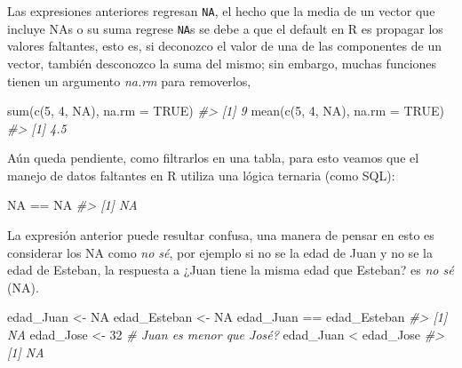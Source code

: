 \documentclass[
]{book}
\newenvironment{Shaded}{\begin{snugshade}}{\end{snugshade}}
\newcommand{\AttributeTok}[1]{\textcolor[rgb]{0.77,0.63,0.00}{#1}}
\newcommand{\CommentTok}[1]{\textcolor[rgb]{0.56,0.35,0.01}{\textit{#1}}}
\newcommand{\ConstantTok}[1]{\textcolor[rgb]{0.00,0.00,0.00}{#1}}
\newcommand{\DecValTok}[1]{\textcolor[rgb]{0.00,0.00,0.81}{#1}}
\newcommand{\FunctionTok}[1]{\textcolor[rgb]{0.00,0.00,0.00}{#1}}
\newcommand{\NormalTok}[1]{#1}
\newcommand{\OtherTok}[1]{\textcolor[rgb]{0.56,0.35,0.01}{#1}}
\newcommand{\SpecialCharTok}[1]{\textcolor[rgb]{0.00,0.00,0.00}{#1}}
\begin{document}
Las expresiones anteriores regresan \texttt{NA}, el hecho que la media de un vector
que incluye NAs o su suma regrese \texttt{NA}s se debe a que el default en R es
propagar los valores faltantes, esto es, si deconozco el valor de una de las
componentes de un vector, también desconozco la suma del mismo; sin embargo,
muchas funciones tienen un argumento \emph{na.rm} para removerlos,

\begin{Shaded}
\begin{Highlighting}[]
\FunctionTok{sum}\NormalTok{(}\FunctionTok{c}\NormalTok{(}\DecValTok{5}\NormalTok{, }\DecValTok{4}\NormalTok{, }\ConstantTok{NA}\NormalTok{), }\AttributeTok{na.rm =} \ConstantTok{TRUE}\NormalTok{)}
\CommentTok{\#\textgreater{} [1] 9}
\FunctionTok{mean}\NormalTok{(}\FunctionTok{c}\NormalTok{(}\DecValTok{5}\NormalTok{, }\DecValTok{4}\NormalTok{, }\ConstantTok{NA}\NormalTok{), }\AttributeTok{na.rm =} \ConstantTok{TRUE}\NormalTok{)}
\CommentTok{\#\textgreater{} [1] 4.5}
\end{Highlighting}
\end{Shaded}

Aún queda pendiente, como filtrarlos en una tabla, para esto veamos que el
manejo de datos faltantes en R utiliza una lógica ternaria (como SQL):

\begin{Shaded}
\begin{Highlighting}[]
\ConstantTok{NA} \SpecialCharTok{==} \ConstantTok{NA}
\CommentTok{\#\textgreater{} [1] NA}
\end{Highlighting}
\end{Shaded}

La expresión anterior puede resultar confusa, una manera de pensar en esto es
considerar los NA como \emph{no sé}, por ejemplo si no se la edad de Juan y no se la
edad de Esteban, la respuesta a ¿Juan tiene la misma edad que Esteban? es
\emph{no sé} (NA).

\begin{Shaded}
\begin{Highlighting}[]
\NormalTok{edad\_Juan }\OtherTok{\textless{}{-}} \ConstantTok{NA}
\NormalTok{edad\_Esteban }\OtherTok{\textless{}{-}} \ConstantTok{NA}
\NormalTok{edad\_Juan }\SpecialCharTok{==}\NormalTok{ edad\_Esteban}
\CommentTok{\#\textgreater{} [1] NA}
\NormalTok{edad\_Jose }\OtherTok{\textless{}{-}} \DecValTok{32}
\CommentTok{\# Juan es menor que José?}
\NormalTok{edad\_Juan }\SpecialCharTok{\textless{}}\NormalTok{ edad\_Jose}
\CommentTok{\#\textgreater{} [1] NA}
\end{Highlighting}
\end{Shaded}
\end{document}
